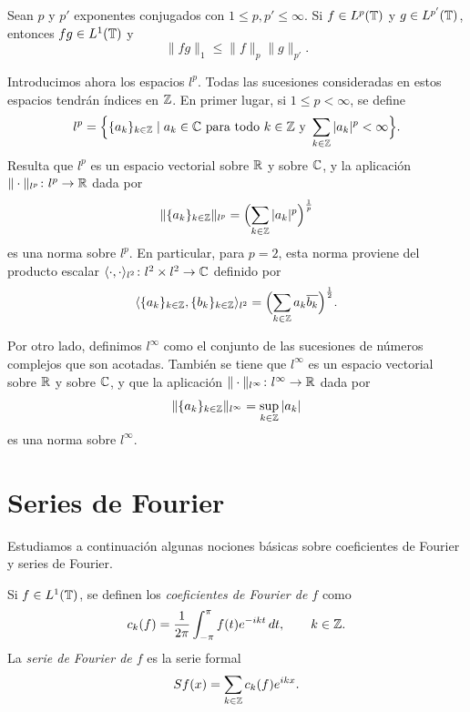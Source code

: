 \documentclass[a4paper, 12pt, oneside]{book}
\begin{document}
\begin{theorem}
    Sean $p$ y $p'$ exponentes conjugados con $1 \leq p,p' \leq \infty$. Si $f \in L^p(\mathbb T)$ y $g \in L^{p'}(\mathbb T)$, entonces $fg \in L^1(\mathbb T)$ y
    \[\|fg\|_1 \leq \|f\|_p\|g\|_{p'}.\]
\end{theorem}



Introducimos ahora los espacios $l^p$. Todas las sucesiones consideradas en estos espacios tendrán índices en $\mathbb Z$. En primer lugar, si $1\leq p<\infty$, se define
\[l^p=\Bigl\{\{a_k\}_{k\in \mathbb Z} \mid a_k \in \mathbb C \textup{ para todo } k \in \mathbb Z \textup{ y } \sum_{k\in\mathbb Z}|a_k|^p < \infty\Bigr\}.\]
Resulta que $l^p$ es un espacio vectorial sobre $\mathbb R$ y sobre $\mathbb C$, y la aplicación $\|\cdot\|_{l^p} \colon l^p \to \mathbb R$ dada por
\[\|\{a_k\}_{k\in\mathbb Z}\|_{l^p} = \Bigl(\sum_{k\in\mathbb Z}|a_k|^p\Bigr)^{\frac{1}{p}}\]
es una norma sobre $l^p$. En particular, para $p = 2$, esta norma proviene del producto escalar $\langle \cdot, \cdot \rangle_{l^2} \colon l^2 \times l^2 \to \mathbb C$ definido por
\[\langle \{a_k\}_{k\in\mathbb Z}, \{b_k\}_{k\in\mathbb Z} \rangle_{l^2} = \Bigl(\sum_{k\in\mathbb Z}a_k\overline{b_k}\Bigr)^{\frac{1}{2}}.\] 

Por otro lado, definimos $l^\infty$ como el conjunto de las sucesiones de números complejos que son acotadas. También se tiene que $l^\infty$ es un espacio vectorial sobre $\mathbb R$ y sobre $\mathbb C$, y que la aplicación $\|\cdot\|_{l^\infty} \colon l^\infty \to \mathbb R$ dada por
\[\|\{a_k\}_{k\in\mathbb Z}\|_{l^\infty} = \sup_{k\in\mathbb Z} |a_k|\]
es una norma sobre $l^\infty$.

\section{Series de Fourier}

Estudiamos a continuación algunas nociones básicas sobre coeficientes de Fourier y series de Fourier.

\begin{definition}
    Si $f \in L^1(\mathbb T)$, se definen los \emph{coeficientes de Fourier de $f$} como
    \[c_k(f) = \frac{1}{2\pi}\int_{-\pi}^{\pi} f(t)e^{-ikt} \, dt, \qquad k \in \mathbb Z.\]
    La \emph{serie de Fourier de $f$} es la serie formal
    \[Sf(x) = \sum_{ k \in \mathbb Z} c_k(f)e^{ikx}.\]
\end{definition}
\end{document}
